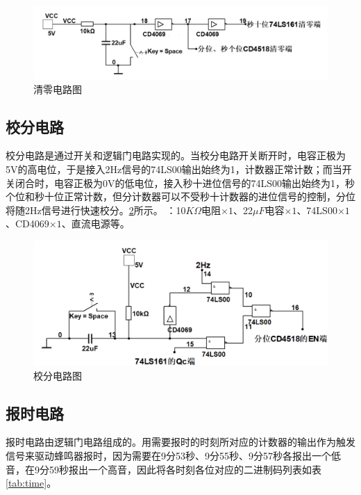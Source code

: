 \documentclass[12pt]{article}
\begin{document}
\begin{figure}[h]
\centering
\includegraphics[width=\textwidth]{TIM20180922213402.png}
\caption{清零电路图}
  \label{fig:qingling}
\end{figure}
\subsection{校分电路}
校分电路是通过开关和逻辑门电路实现的。当校分电路开关断开时，电容正极为5V的高电位，于是接入2Hz信号的74LS00输出始终为1，计数器正常计数；而当开关闭合时，电容正极为0V的低电位，接入秒十进位信号的74LS00输出始终为1，秒个位和秒十位正常计数，但分计数器可以不受秒十计数器的进位信号的控制，分位将随2Hz信号进行快速校分。\ref{fig:jiaofen}所示。
：10$K\Omega$电阻$\times1$、22$\mu F$电容$\times1$、74LS00$\times1$、CD4069$\times1$、直流电源等。
\begin{figure}[h]
\centering
\includegraphics[width=\textwidth]{TIM20180922212603.png}
\caption{校分电路图}
  \label{fig:jiaofen}
\end{figure}

\subsection{报时电路}\label{end}
报时电路由逻辑门电路组成的。用需要报时的时刻所对应的计数器的输出作为触发信号来驱动蜂鸣器报时，因为需要在9分53秒、9分55秒、9分57秒各报出一个低音，在9分59秒报出一个高音，因此将各时刻各位对应的二进制码列表如表\ref{tab:time}。
\end{document}
